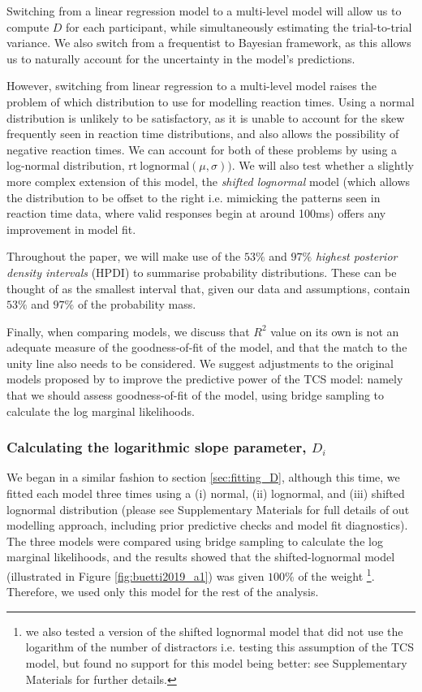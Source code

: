 \documentclass[smallextended, natbib]{svjour3}       %
\begin{document}
Switching from a linear regression model to a multi-level model will allow us to compute $D$ for each participant, while simultaneously estimating the trial-to-trial variance. We also switch from a frequentist to Bayesian framework, as this allows us to naturally account for the uncertainty in the model's predictions.

However, switching from linear regression to a multi-level model raises the problem of which distribution to use for modelling reaction times. Using a normal distribution is unlikely to be satisfactory, as it is unable to account for the skew frequently seen in reaction time distributions, and also allows the possibility of negative reaction times. We can account for both of these problems by using a log-normal distribution, $\text{rt} ~ \text{lognormal}(\mu, \sigma))$. We will also test whether a slightly more complex extension of this model, the \textit{shifted lognormal} model (which allows the distribution to be offset to the right i.e. mimicking the patterns seen in reaction time data, where valid responses begin at around 100ms) offers any improvement in model fit.

Throughout the paper, we will make use of the $53\%$ and $97\%$ \textit{highest posterior density intervals} (HPDI) to summarise probability distributions. These can be thought of as the smallest interval that, given our data and assumptions, contain $53\%$ and $97\%$ of the probability mass. 

Finally, when comparing models, we discuss that $R^2$ value on its own is not an adequate measure of the goodness-of-fit of the model, and that the match to the unity line also needs to be considered. We suggest adjustments to the original models proposed by \cite{buetti2019predicting} to improve the predictive power of the TCS model: namely that we should assess goodness-of-fit of the model, using bridge sampling to calculate the log marginal likelihoods.

\subsubsection{Calculating the logarithmic slope parameter, $D_i$}

We began in a similar fashion to section \ref{sec:fitting_D}, although this time, we fitted each model three times using a (i) normal, (ii) lognormal, and (iii) shifted lognormal distribution (please see Supplementary Materials for full details of out modelling approach, including prior predictive checks and model fit diagnostics). The three models were compared using bridge sampling to calculate the log marginal likelihoods, and the results showed that the shifted-lognormal model (illustrated in Figure \ref{fig:buetti2019_a1}) was given $100\%$ of the weight \footnote{we also tested a version of the shifted lognormal model that did not use the logarithm of the number of distractors i.e. testing this assumption of the TCS model, but found no support for this model being better: see Supplementary Materials for further details.}. Therefore, we used only this model for the rest of the analysis. 
\end{document}
